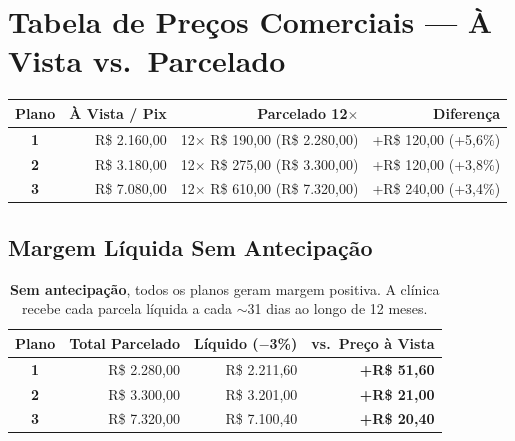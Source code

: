 \documentclass[12pt, a4paper]{article}
\newcommand{\reais}[1]{R\$ #1}
\begin{document}
\needspace{8cm}

\section{Tabela de Preços Comerciais — À Vista vs.\ Parcelado}

\begin{table}[H]
    \centering
    \renewcommand{\arraystretch}{1.5}
    \begin{tabularx}{\textwidth}{c r r r}
        \toprule
        \rowcolor{tableHeader} \textbf{Plano} & \textbf{À Vista / Pix} & \textbf{Parcelado 12$\times$} & \textbf{Diferença} \\
        \midrule
        \textbf{1} & \reais{2.160,00} & 12$\times$ \reais{190,00} (\reais{2.280,00}) & +\reais{120,00} (+5,6\%) \\
        \rowcolor{lightGray}
        \textbf{2} & \reais{3.180,00} & 12$\times$ \reais{275,00} (\reais{3.300,00}) & +\reais{120,00} (+3,8\%) \\
        \textbf{3} & \reais{7.080,00} & 12$\times$ \reais{610,00} (\reais{7.320,00}) & +\reais{240,00} (+3,4\%) \\
        \bottomrule
    \end{tabularx}
\end{table}

\subsection{Margem Líquida Sem Antecipação}

\begin{table}[H]
    \centering
    \renewcommand{\arraystretch}{1.4}
    \begin{tabularx}{\textwidth}{c r r r}
        \toprule
        \rowcolor{tableHeader} \textbf{Plano} & \textbf{Total Parcelado} & \textbf{Líquido ($-$3\%)} & \textbf{vs.\ Preço à Vista} \\
        \midrule
        \textbf{1} & \reais{2.280,00} & \reais{2.211,60} & \textcolor{successGreen}{\textbf{+R\$ 51,60}} \\
        \rowcolor{lightGray}
        \textbf{2} & \reais{3.300,00} & \reais{3.201,00} & \textcolor{successGreen}{\textbf{+R\$ 21,00}} \\
        \textbf{3} & \reais{7.320,00} & \reais{7.100,40} & \textcolor{successGreen}{\textbf{+R\$ 20,40}} \\
        \bottomrule
    \end{tabularx}
    \caption*{\footnotesize \textbf{Sem antecipação}, todos os planos geram margem positiva. A clínica recebe cada parcela líquida a cada $\sim$31 dias ao longo de 12 meses.}
\end{table}
\end{document}
